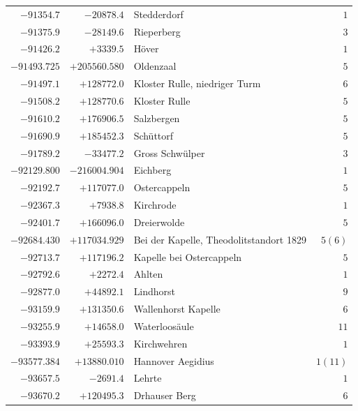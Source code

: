 \begin{center}
\begin{tabular}{r|r|p{170pt}|r}
\(-91354.7\)&\(-20878.4\)&Stedderdorf&\(1\)\\
\(-91375.9\)&\(-28149.6\)&Rieperberg&\(3\)\\
\(-91426.2\)&\(+3339.5\)&Höver&\(1\)\\
\(-91493.725\)&\(+205560.580\)&Oldenzaal&\(5\)\\
\(-91497.1\)&\(+128772.0\)&Kloster Rulle, niedriger Turm&\(6\)\\
\(-91508.2\)&\(+128770.6\)&Kloster Rulle&\(5\)\\
\(-91610.2\)&\(+176906.5\)&Salzbergen&\(5\)\\
\(-91690.9\)&\(+185452.3\)&Schüttorf&\(5\)\\
\(-91789.2\)&\(-33477.2\)&Gross Schwülper&\(3\)\\
\(-92129.800\)&\(-216004.904\)&Eichberg&\(1\)\\
\(-92192.7\)&\(+117077.0\)&Ostercappeln&\(5\)\\
\(-92367.3\)&\(+7938.8\)&Kirchrode&\(1\)\\
\(-92401.7\)&\(+166096.0\)&Dreierwolde&\(5\)\\
\(-92684.430\)&\(+117034.929\)&Bei der Kapelle, Theodolitstandort 1829&\(5 (6)\)\\
\(-92713.7\)&\(+117196.2\)&Kapelle bei Ostercappeln&\(5\)\\
\(-92792.6\)&\(+2272.4\)&Ahlten&\(1\)\\
\(-92877.0\)&\(+44892.1\)&Lindhorst&\(9\)\\
\(-93159.9\)&\(+131350.6\)&Wallenhorst Kapelle&\(6\)\\
\(-93255.9\)&\(+14658.0\)&Waterloosäule&\(11\)\\
\(-93393.9\)&\(+25593.3\)&Kirchwehren&\(1\)\\
\(-93577.384\)&\(+13880.010\)&Hannover Aegidius&\(1(11)\)\\
\(-93657.5\)&\(-2691.4\)&Lehrte&\(1\)\\
\(-93670.2\)&\(+120495.3\)&Drhauser Berg&\(6\)\\
\hline\end{tabular}\endgroup\end{center}
\clearpage
